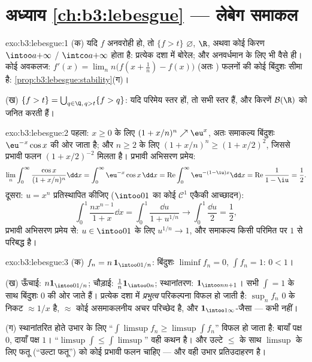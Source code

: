 \section*{अध्याय \ref{ch:b3:lebesgue} --- लेबेग
समाकल}

\begin{solution}{exo:b3:lebesgue:1}
(क) यदि $f$ अनवरोही हो, तो $\{f > t\}$ $\varnothing$, $\R$, अथवा कोई किरण $\intoo a{+\infty}$ / $\intco a{+\infty}$
होता है: प्रत्येक दशा में बोरेल; और अनवर्धमान के लिए भी वैसे ही।
कोई अवकलज: $f'(x) =
\lim_n n\bigl(f(x + \frac1n) - f(x)\bigr)$  (अतः ) फलनों की कोई बिंदुशः सीमा है:
\cref{prop:b3:lebesgue:stability}(ग)।

(ख) $\{f > t\} = \bigcup_{q \in \Q,\, q > t}\{f > q\}$: यदि परिमेय स्तर  हों, तो सभी स्तर  हैं, और
किरणें $\mathcal B(\R)$ को जनित करती हैं।
\end{solution}

\begin{solution}{exo:b3:lebesgue:2}
पहला: $x \geq 0$ के लिए $(1 + x/n)^n \nearrow \eu^x$, अतः समाकल्य बिंदुशः $\eu^{-x}\cos x$ की ओर जाता है;
और $n \geq 2$ के लिए $(1 + x/n)^n \geq (1 + x/2)^2$, जिससे  प्रभावी फलन $(1 + x/2)^{-2}$ मिलता है।
प्रभावी अभिसरण प्रमेय:
\[
\lim_n\int_0^\infty\frac{\cos x}{(1 + x/n)^n}\dd x
= \int_0^\infty \eu^{-x}\cos x\,\dd x
= \operatorname{Re}\int_0^\infty\eu^{-(1 - \iu)x}\dd x
= \operatorname{Re}\frac{1}{1 - \iu} = \frac12 .
\]
दूसरा: $u = x^n$ प्रतिस्थापित कीजिए ($\intoo01$ का कोई $\mathcal C^1$ एकैकी आच्छादन):
\[
\int_0^1\frac{nx^{n-1}}{1 + x}\dd x = \int_0^1\frac{\dd u}{1 +
u^{1/n}} \longrightarrow \int_0^1\frac{\dd u}{2} = \frac12,
\]
प्रभावी अभिसरण प्रमेय से: $u \in \intoo01$ के लिए $u^{1/n} \to 1$, और समाकल्य किसी परिमित
 पर $1$ से परिबद्ध है।
\end{solution}

\begin{solution}{exo:b3:lebesgue:3}
(क) $f_n = n\,\mathbf 1_{\intoo0{1/n}}$: बिंदुशः $\liminf f_n = 0$, $\int f_n = 1$: $0 < 1$।

(ख) ऊँचाई: $n\mathbf 1_{\intoo0{1/n}}$; चौड़ाई: $\frac1n\mathbf
1_{\intoo0n}$; स्थानांतरण: $\mathbf 1_{\intoo n{n+1}}$। सभी $\int = 1$ के साथ
बिंदुशः $0$ की ओर जाते हैं। प्रत्येक दशा में \emph{प्रभुत्व}
परिकल्पना विफल हो जाती है: $\sup_nf_n$ $0$ के निकट $\approx 1/x$ है, $\approx$ कोई
असमाकलनीय अचर परिच्छेद है, और $\mathbf 1_{\intoo1\infty}$-जैसा --- कभी  नहीं।

(ग) स्थानांतरित होते उभार के लिए ``$\int\limsup f_n \geq \limsup\int f_n$'' विफल हो जाता है: बायाँ
पक्ष $0$, दायाँ पक्ष $1$। ``$\limsup\int \leq \int\limsup$'' वही कथन है। और उल्टे $\leq$ के
साथ $\limsup$ के लिए फतू (``उल्टा फतू'') को कोई प्रभावी फलन चाहिए ---
और वही उभार प्रतिउदाहरण है।
\end{solution}

